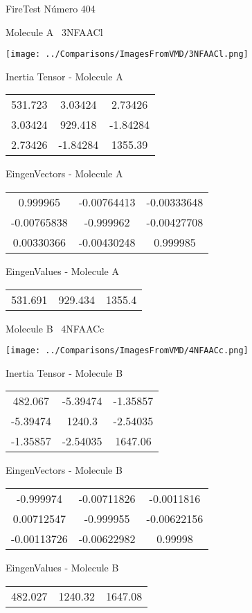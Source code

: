 \vtab[-3cm]
\begin{center}
{\large FireTest \tab Número 404}
\end{center}
\begin{multicols}{2}
\begin{center}

Molecule A \
3NFAACl

\texttt{[image: ../Comparisons/ImagesFromVMD/3NFAACl.png]}

Inertia Tensor - Molecule A \\
\begin{tabular}{|c c c|}
531.723	 & 	3.03424	 & 	2.73426	 \\
3.03424	 & 	929.418	 & 	-1.84284	 \\
2.73426	 & 	-1.84284	 & 	1355.39
\end{tabular}

\vtab
 EingenVectors - Molecule A     \\
\begin{tabular}{|c c c|}
0.999965	 & 	-0.00764413	 & 	-0.00333648	 \\
-0.00765838	 & 	-0.999962	 & 	-0.00427708	 \\
0.00330366	 & 	-0.00430248	 & 	0.999985
\end{tabular}

\vtab
 EingenValues - Molecule A     \\
\begin{tabular}{|c c c|}
531.691	 & 	929.434	 & 	1355.4	 \\
\end{tabular}
\columnbreak

Molecule B \
4NFAACc

\texttt{[image: ../Comparisons/ImagesFromVMD/4NFAACc.png]}

Inertia Tensor - Molecule B \\
\begin{tabular}{|c c c|}
482.067	 & 	-5.39474	 & 	-1.35857	 \\
-5.39474	 & 	1240.3	 & 	-2.54035	 \\
-1.35857	 & 	-2.54035	 & 	1647.06
\end{tabular}

\vtab
 EingenVectors - Molecule B     \\
\begin{tabular}{|c c c|}
-0.999974	 & 	-0.00711826	 & 	-0.0011816	 \\
0.00712547	 & 	-0.999955	 & 	-0.00622156	 \\
-0.00113726	 & 	-0.00622982	 & 	0.99998
\end{tabular}

\vtab
 EingenValues - Molecule B     \\
\begin{tabular}{|c c c|}
482.027	 & 	1240.32	 & 	1647.08	 \\
\end{tabular}

\end{center}
\end{multicols}

